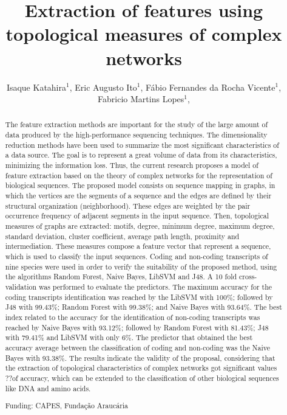 \documentclass[twoside]{article}
\title{\vspace{-15mm}\fontsize{24pt}{10pt}\selectfont\textbf{ Extraction of features using topological measures of complex networks }} %
\author{ Isaque Katahira$^{1}$, Eric Augusto Ito$^{1}$, Fábio Fernandes da  Rocha Vicente$^{1}$, Fabricio Martins Lopes$^{1}$, }
\affil{ 1 Federal Technological University of Paraná

 }
\date{}
\begin{document}
  
  
  \maketitle %
  
  
  \thispagestyle{fancy} %
  
  
  \begin{abstract}
  The feature extraction methods are important for the study of the large amount of data produced by the high-performance sequencing techniques. The dimensionality reduction methods have been used to summarize the most significant characteristics of a data source. The goal is to represent a great volume of data from its characteristics, minimizing the information loss. Thus, the current research proposes a model of feature extraction based on the theory of complex networks for the representation of biological sequences. The proposed model consists on sequence mapping in graphs, in which the vertices are the segments of a sequence and the edges are defined by their structural organization (neighborhood). These edges are weighted by the pair occurrence frequency of adjacent segments in the input sequence. Then, topological measures of graphs are extracted: motifs, degree, minimum degree, maximum degree, standard deviation, cluster coefficient, average path length, proximity and intermediation. These measures compose a feature vector that represent a sequence, which is used to classify the input sequences. Coding and non-coding transcripts of nine species were used in order to verify the suitability of the proposed method, using the algorithms Random Forest, Naive Bayes, LibSVM and J48. A 10 fold cross-validation was performed to evaluate the predictors. The maximum accuracy for the coding transcripts identification was reached by the LibSVM with 100\%; followed by J48 with 99.43\%; Random Forest with 99.38\%; and Naive Bayes with 93.64\%. The best index related to the accuracy for the identification of non-coding transcripts was reached by Naive Bayes with 93.12\%; followed by Random Forest with 81.43\%; J48 with 79.41\% and LibSVM with only 6\%. The predictor that obtained the best accuracy average between the classification of coding and non-coding was the Naive Bayes with 93.38\%. The results indicate the validity of the proposal, considering that the extraction of topological characteristics of complex networks got significant values ??of accuracy, which can be extended to the classification of other biological sequences like DNA and amino acids.
  
  Funding: CAPES, Funda\c{c}\~ao Arauc\'aria \\ 
  \end{abstract}
  
\end{document}
